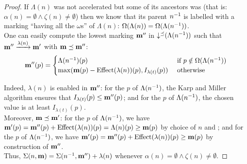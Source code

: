 \begin{proof}
  If $\Lambda(n)$ was not accelerated but some of its ancestors was (that is:
  $\alpha(n) = \emptyset \wedge \zeta(n) \neq \emptyset$)
  then
  we know that its parent $n^{-1}$ is labelled with a marking ``having all the $\omega$s'' of $\Lambda(n)$:
  $\Omega(\Lambda(n)) = \Omega(\Lambda(n^{-1}))$.\\
  One can easily compute the lowest marking $\mathbf{m''}$ in $\operatorname{\downarrow^\preceq}(\Lambda(n^{-1}))$ such that $\mathbf{m''} \xrightarrow{\lambda(n)} \mathbf{m'}$ with $\mathbf{m} \preceq \mathbf{m''}$:
  \[
    \mathbf{m''}(p) = \begin{cases}
      \Lambda(n^{-1})(p)
        &\text{ if } p \notin \Omega(\Lambda(n^{-1})) \\
      \max(\mathbf{m}(p) - \operatorname{Effect}(\lambda(n))(p), I_{\lambda(t)}(p))
        &\text{ otherwise}
    \end{cases}
  \]

  Indeed, %
  $\lambda(n)$ is enabled in $\mathbf{m''}$:
  for the \noplaces $p$ of $\Lambda(n^{-1})$, the Karp and Miller algorithm ensures that $I_{\lambda(t)}(p) \leq \mathbf{m''}(p)$;
  and for the \oplaces $p$ of $\Lambda(n^{-1})$, the chosen value is at least $I_{\lambda(t)}(p)$.\\
  Moreover, %
  $\mathbf{m} \preceq \mathbf{m'}$:
  for the \noplaces $p$ of $\Lambda(n^{-1})$, we have $\mathbf{m'}(p) = \mathbf{m''}(p) + \operatorname{Effect}(\lambda(n))(p) = \Lambda(n)(p) \geq \mathbf{m}(p)$ by choice of $n$ and \mar;
  and for the \oplaces $p$ of $\Lambda(n^{-1})$, we have $\mathbf{m'}(p) = \mathbf{m''}(p) + \operatorname{Effect}(\lambda(n))(p) \geq \mathbf{m}(p)$ by construction of $\mathbf{m''}$.\\
  Thus, $\Sigma(n, \mathbf{m}) = \Sigma(n^{-1}, \mathbf{m''}) + \lambda(n)$
  whenever
  $\alpha(n) = \emptyset \wedge \zeta(n) \neq \emptyset$.


\end{proof}
